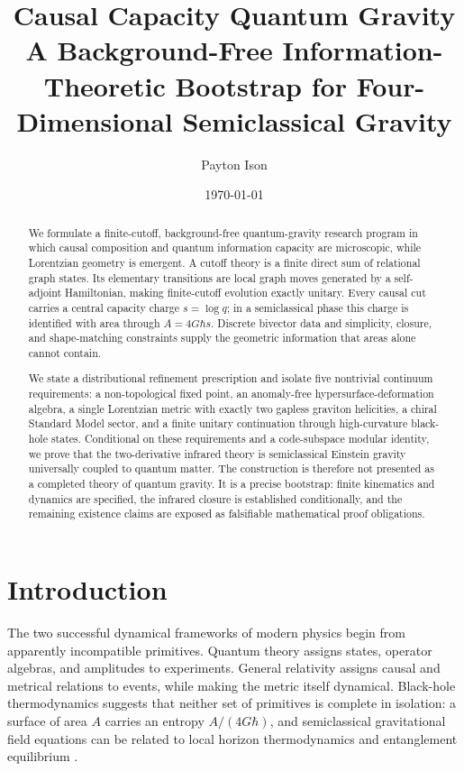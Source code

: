 \documentclass[11pt]{article}
\title{\textbf{Causal Capacity Quantum Gravity}\\
\large A Background-Free Information-Theoretic Bootstrap for
Four-Dimensional Semiclassical Gravity}
\author{Payton Ison}
\date{\today}
\theoremstyle{remark}
\begin{document}
\maketitle

\begin{abstract}
We formulate a finite-cutoff, background-free quantum-gravity research
program in which causal composition and quantum information capacity are
microscopic, while Lorentzian geometry is emergent.  A cutoff theory is a
finite direct sum of relational graph states.  Its elementary transitions
are local graph moves generated by a self-adjoint Hamiltonian, making
finite-cutoff evolution exactly unitary.  Every causal cut carries a
central capacity charge \(s=\log q\); in a semiclassical phase this charge
is identified with area through \(A=4G\hbar s\).  Discrete bivector data and
simplicity, closure, and shape-matching constraints supply the geometric
information that areas alone cannot contain.

We state a distributional refinement prescription and isolate five
nontrivial continuum requirements: a non-topological fixed point, an
anomaly-free hypersurface-deformation algebra, a single Lorentzian metric
with exactly two gapless graviton helicities, a chiral Standard Model
sector, and a finite unitary continuation through high-curvature
black-hole states.  Conditional on these requirements and a
code-subspace modular identity, we prove that the two-derivative infrared
theory is semiclassical Einstein gravity universally coupled to quantum
matter.  The construction is therefore not presented as a completed
theory of quantum gravity.  It is a precise bootstrap: finite kinematics
and dynamics are specified, the infrared closure is established
conditionally, and the remaining existence claims are exposed as
falsifiable mathematical proof obligations.
\end{abstract}

\tableofcontents

\section{Introduction}

The two successful dynamical frameworks of modern physics begin from
apparently incompatible primitives.  Quantum theory assigns states,
operator algebras, and amplitudes to experiments.  General relativity
assigns causal and metrical relations to events, while making the metric
itself dynamical.  Black-hole thermodynamics suggests that neither set of
primitives is complete in isolation: a surface of area \(A\) carries an
entropy \(A/(4G\hbar)\), and semiclassical gravitational field equations
can be related to local horizon thermodynamics and entanglement
equilibrium \cite{Bekenstein1973,Hawking1975,Jacobson1995,Jacobson2015}.
\end{document}
